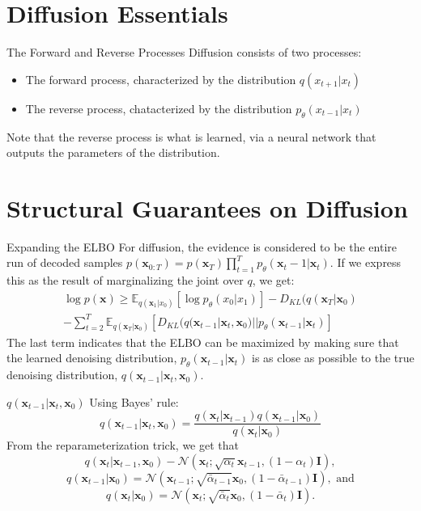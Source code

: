 \documentclass{beamer}
\begin{document}
\section{Diffusion Essentials}
\begin{frame}{The Forward and Reverse Processes}
  Diffusion consists of two processes:
  \begin{itemize}
    \item The forward process, characterized by the distribution $q(x_{t+1} | x_t)$
    \item The reverse process, chatacterized by the distribution $p_{\theta}(x_{t-1} | x_t)$
  \end{itemize}
  Note that the reverse process is what is learned, via a neural network that outputs the parameters of the distribution. 
\end{frame}
\section{Structural Guarantees on Diffusion}
\begin{frame}{Expanding the ELBO}
For diffusion, the evidence is considered to be the entire run of decoded samples $p(\mathbf{x}_{0:T}) = p(\mathbf{x}_T)\prod_{t = 1 }^{T}p_{\theta}(\mathbf{x}_t-1 | \mathbf{x}_t) $.
If we express this as the result of marginalizing the joint over $q$, we get:
\begin{multline*}
\log p(\mathbf{x}) \geq \mathbb{E}_{q(\mathbf{x}_{1} | x_0)}[\log p_{\theta}(x_0 | x_1)]  - D_{KL}(q(\mathbf{x}_T | \mathbf{x}_0) \\
- \sum_{t = 2 }^{T} \mathbb{E}_{q(\mathbf{x}_T | \mathbf{x}_0)}[D_{KL}(q(\mathbf{x}_{t-1} | \mathbf{x}_{t}, \mathbf{x}_0) || p_{\theta}(\mathbf{x}_{t-1}|\mathbf{x}_t)] 
\end{multline*} 
The last term indicates that the ELBO can be maximized by making sure that the learned denoising distribution, $p_{\theta}(\mathbf{x}_{t-1}|\mathbf{x}_t)$ is as close as possible to the true denoising distribution, $q(\mathbf{x}_{t-1}|\mathbf{x}_t, \mathbf{x}_0)$. 
\end{frame}
\begin{frame}{$q(\mathbf{x}_{t-1}|\mathbf{x}_t, \mathbf{x}_0)$}
  Using Bayes' rule:
  \begin{equation*}
  q(\mathbf{x}_{t-1}|\mathbf{x}_t, \mathbf{x}_0) = \frac{q(\mathbf{x}_t | \mathbf{x}_{t-1})q(\mathbf{x}_{t-1}|\mathbf{x}_0)}{q(\mathbf{x}_t | \mathbf{x}_0)}
  \end{equation*}
  From the reparameterization trick, we get that 
  \[ 
  q(\mathbf{x}_t|\mathbf{x}_{t-1}, \mathbf{x}_0) - \mathcal{N}(\mathbf{x}_t; \sqrt{\alpha_t}\mathbf{x}_{t-1}, (1-\alpha_t)\mathbf{I})
  ,\]
  \[ 
  q(\mathbf{x}_{t-1}|\mathbf{x}_0) = \mathcal{N}(\mathbf{x}_{t-1}; \sqrt{\bar\alpha_{t-1}}\mathbf{x}_0, (1-\bar\alpha_{t-1})\mathbf{I})
  ,\text{ and}
\] 
  \[ 
  q(\mathbf{x}_t|\mathbf{x}_0) = \mathcal{N}(\mathbf{x}_t; \sqrt{\bar\alpha_t}\mathbf{x}_0, (1-\bar\alpha_t)\mathbf{I})
  .\] 
\end{frame}
\end{document}

